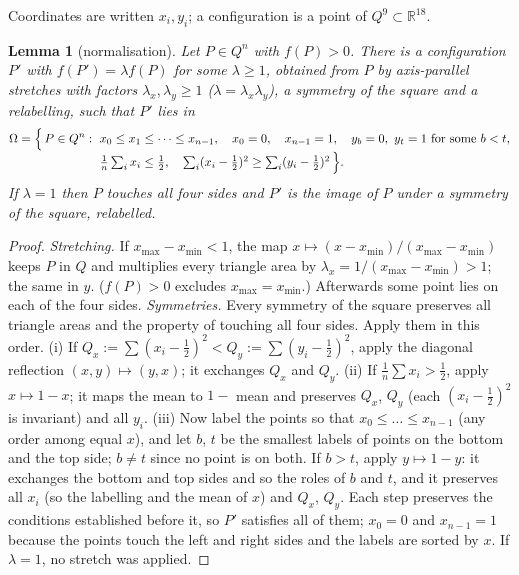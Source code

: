 \documentclass[11pt]{amsart}
\newtheorem{lemma}[theorem]{Lemma}
\theoremstyle{definition}
\newcommand{\R}{\mathbb{R}}
\begin{document}
Coordinates are written $x_i, y_i$; a configuration is a point of $Q^9 \subset \R^{18}$.

\begin{lemma}[normalisation]\label{lem:norm}
Let $P \in Q^n$ with $f(P) > 0$. There is a configuration $P'$ with $f(P') = \lambda f(P)$ for some $\lambda \ge 1$, obtained from $P$ by axis-parallel stretches with factors $\lambda_x, \lambda_y \ge 1$ ($\lambda = \lambda_x\lambda_y$), a symmetry of the square and a relabelling, such that $P'$ lies in
\[
\Omega = \Bigl\{\, P \in Q^n :\ \begin{aligned}[t]
 &x_0 \le x_1 \le \dots \le x_{n-1},\quad x_0 = 0,\quad x_{n-1} = 1,\quad y_b = 0,\ y_t = 1 \text{ for some } b < t,\\
 &\tfrac1n\textstyle\sum_i x_i \le \tfrac12,\quad \sum_i (x_i - \tfrac12)^2 \ge \sum_i (y_i - \tfrac12)^2 \,\Bigr\}.
\end{aligned}
\]
If $\lambda = 1$ then $P$ touches all four sides and $P'$ is the image of $P$ under a symmetry of the square, relabelled.
\end{lemma}

\begin{proof}
\emph{Stretching.} If $x_{\max} - x_{\min} < 1$, the map $x \mapsto (x - x_{\min})/(x_{\max}-x_{\min})$ keeps $P$ in $Q$ and multiplies every triangle area by $\lambda_x = 1/(x_{\max}-x_{\min}) > 1$; the same in $y$. ($f(P) > 0$ excludes $x_{\max} = x_{\min}$.) Afterwards some point lies on each of the four sides. %
\emph{Symmetries.} Every symmetry of the square preserves all triangle areas and the property of touching all four sides. Apply them in this order.
(i) If $Q_x := \sum(x_i - \frac12)^2 < Q_y := \sum(y_i-\frac12)^2$, apply the diagonal reflection $(x,y) \mapsto (y,x)$; it exchanges $Q_x$ and $Q_y$.
(ii) If $\frac1n\sum x_i > \frac12$, apply $x \mapsto 1-x$; it maps the mean to $1 - $ mean and preserves $Q_x$, $Q_y$ (each $(x_i - \frac12)^2$ is invariant) and all $y_i$.
(iii) Now label the points so that $x_0 \le \dots \le x_{n-1}$ (any order among equal $x$), and let $b$, $t$ be the smallest labels of points on the bottom and the top side; $b \ne t$ since no point is on both. If $b > t$, apply $y \mapsto 1-y$: it exchanges the bottom and top sides and so the roles of $b$ and $t$, and it preserves all $x_i$ (so the labelling and the mean of $x$) and $Q_x$, $Q_y$.
Each step preserves the conditions established before it, so $P'$ satisfies all of them; $x_0 = 0$ and $x_{n-1} = 1$ because the points touch the left and right sides and the labels are sorted by $x$. If $\lambda = 1$, no stretch was applied. %
\end{proof}
\end{document}
